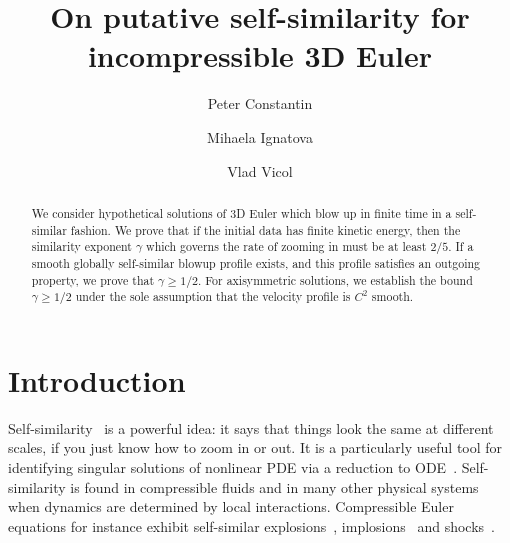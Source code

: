 \documentclass[11pt,reqno]{amsproc}
\numberwithin{equation}{section}
\theoremstyle{remark}
\begin{document}
\title[On self-similarity for incompressible 3D Euler]{On putative self-similarity for incompressible 3D Euler}

\author{Peter Constantin} 
\address{Department of Mathematics, Princeton University, Princeton, NJ 08540}

\author{Mihaela Ignatova}
\address{Department of Mathematics, Temple University, Philadelphia, PA 19122}

\author{Vlad Vicol}
\address{Courant Institute of Mathematical Sciences, New York University, New York, NY, 10012}

\begin{abstract}
We consider hypothetical solutions of 3D Euler which blow up in finite time  in a self-similar fashion. We prove that if the initial data has finite kinetic energy, then the similarity exponent $\gamma$ which governs the rate of zooming in must be at least $2/5$. If a smooth globally self-similar blowup profile exists, and this profile satisfies an outgoing property, we prove that  $\gamma \geq 1/2$. For axisymmetric solutions, we establish the bound $\gamma\geq 1/2$ under the sole assumption that the velocity profile is $C^2$ smooth.
\end{abstract}

\maketitle
 
\section{Introduction}

Self-similarity~\cite{Barenblatt96} is a powerful idea: it says that things look the same at different scales, if you just know how to zoom in or out. It is a particularly useful tool for identifying singular solutions of nonlinear PDE via a reduction to ODE~\cite{Sedov18,EggersFontelos15}. 
Self-similarity is found in compressible fluids   and in many other physical systems when dynamics are determined by local interactions. Compressible Euler equations for instance exhibit self-similar explosions~\cite{Sedov46,vonNeumann47,Taylor50}, implosions~\cite{Guderley42,Hunter60,MRRS22a,BCG25,SWWZ25} and shocks~\cite{BSV22,BSV23}.
\end{document}
